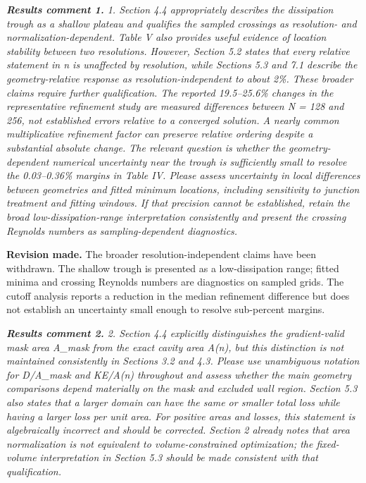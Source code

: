 \documentclass[11pt,a4paper]{article}
\newcommand{\qcomment}[1]{\textcolor{deepblue}{\itshape #1}}
\newcommand{\revwork}[1]{\textbf{\textcolor{revgreen}{#1}}}
\begin{document}
\medskip
\noindent\qcomment{\textbf{Results comment 1.} 1. Section 4.4 appropriately describes the dissipation trough as a shallow plateau and qualifies the sampled crossings as resolution- and normalization-dependent. Table V also provides useful evidence of location stability between two resolutions. However, Section 5.2 states that every relative statement in n is unaffected by resolution, while Sections 5.3 and 7.1 describe the geometry-relative response as resolution-independent to about 2\%. These broader claims require further qualification. The reported 19.5--25.6\% changes in the representative refinement study are measured differences between N = 128 and 256, not established errors relative to a converged solution. A nearly common multiplicative refinement factor can preserve relative ordering despite a substantial absolute change. The relevant question is whether the geometry-dependent numerical uncertainty near the trough is sufficiently small to resolve the 0.03--0.36\% margins in Table IV. Please assess uncertainty in local differences between geometries and fitted minimum locations, including sensitivity to junction treatment and fitting windows. If that precision cannot be established, retain the broad low-dissipation-range interpretation consistently and present the crossing Reynolds numbers as sampling-dependent diagnostics.}

\noindent\revwork{Revision made.} The broader resolution-independent claims have been withdrawn. The shallow trough is presented as a low-dissipation range; fitted minima and crossing Reynolds numbers are diagnostics on sampled grids. The cutoff analysis reports a reduction in the median refinement difference but does not establish an uncertainty small enough to resolve sub-percent margins.

\medskip
\noindent\qcomment{\textbf{Results comment 2.} 2. Section 4.4 explicitly distinguishes the gradient-valid mask area A\_mask from the exact cavity area A(n), but this distinction is not maintained consistently in Sections 3.2 and 4.3. Please use unambiguous notation for D/A\_mask and KE/A(n) throughout and assess whether the main geometry comparisons depend materially on the mask and excluded wall region. Section 5.3 also states that a larger domain can have the same or smaller total loss while having a larger loss per unit area. For positive areas and losses, this statement is algebraically incorrect and should be corrected. Section 2 already notes that area normalization is not equivalent to volume-constrained optimization; the fixed-volume interpretation in Section 5.3 should be made consistent with that qualification.}
\end{document}
